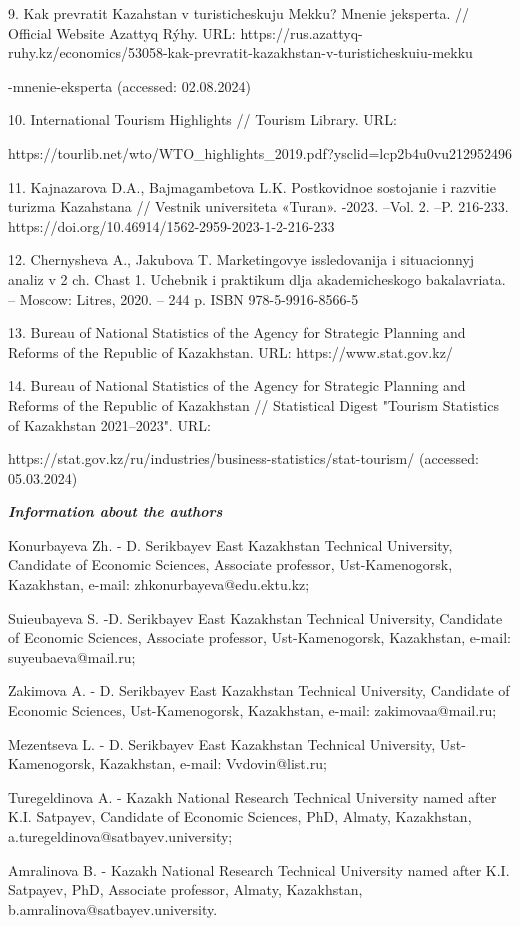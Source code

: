 \begin{noparindent}
9.
Kak prevratit\textquotesingle{} Kazahstan v turisticheskuju Mekku?
Mnenie jeksperta. // Official Website Azattyq Rýhy. URL:
https://rus.azattyq-ruhy.kz/economics/53058-kak-prevratit-kazakhstan-v-turisticheskuiu-mekku

-mnenie-eksperta
(accessed: 02.08.2024)

10.
International Tourism Highlights // Tourism Library. URL:

https://tourlib.net/wto/WTO\_highlights\_2019.pdf?ysclid=lcp2b4u0vu212952496

11.
Kajnazarova D.A., Bajmagambetova L.K. Postkovidnoe sostojanie i
razvitie turizma Kazahstana // Vestnik universiteta «Turan». -2023.
--Vol. 2. --P. 216-233.
https://doi.org/10.46914/1562-2959-2023-1-2-216-233

12.
Chernysheva A., Jakubova T. Marketingovye issledovanija i situacionnyj
analiz v 2 ch. Chast\textquotesingle{} 1. Uchebnik i praktikum dlja
akademicheskogo bakalavriata. -- Moscow: Litres, 2020. -- 244 p. ISBN
978-5-9916-8566-5

13.
Bureau of National Statistics of the Agency for Strategic Planning and
Reforms of the Republic of Kazakhstan. URL: https://www.stat.gov.kz/

14.
Bureau of National Statistics of the Agency for Strategic Planning and
Reforms of the Republic of Kazakhstan // Statistical Digest "Tourism
Statistics of Kazakhstan 2021--2023". URL:

https://stat.gov.kz/ru/industries/business-statistics/stat-tourism/
(accessed: 05.03.2024)
\end{noparindent}

\emph{{\bfseries Information about the authors}}

\begin{noparindent}
Konurbayeva Zh. - D. Serikbayev East Kazakhstan Technical University,
Candidate of Economic Sciences, Associate professor, Ust-Kamenogorsk,
Kazakhstan, e-mail: zhkonurbayeva@edu.ektu.kz;

Suieubayeva S. -D. Serikbayev East Kazakhstan Technical University,
Candidate of Economic Sciences, Associate professor, Ust-Kamenogorsk,
Kazakhstan, e-mail: suyeubaeva@mail.ru;

Zakimova A. - D. Serikbayev East Kazakhstan Technical University,
Candidate of Economic Sciences, Ust-Kamenogorsk, Kazakhstan, e-mail:
zakimovaa@mail.ru;

Mezentseva L. - D. Serikbayev East Kazakhstan Technical University,
Ust-Kamenogorsk, Kazakhstan, e-mail: Vvdovin@list.ru;

Turegeldinova A. - Kazakh National Research Technical University named
after K.I. Satpayev, Candidate of Economic Sciences, PhD, Almaty,
Kazakhstan, a.turegeldinova@satbayev.university;

Amralinova B. - Kazakh National Research Technical University named
after K.I. Satpayev, PhD, Associate professor, Almaty, Kazakhstan,
b.amralinova@satbayev.university.
\end{noparindent}

